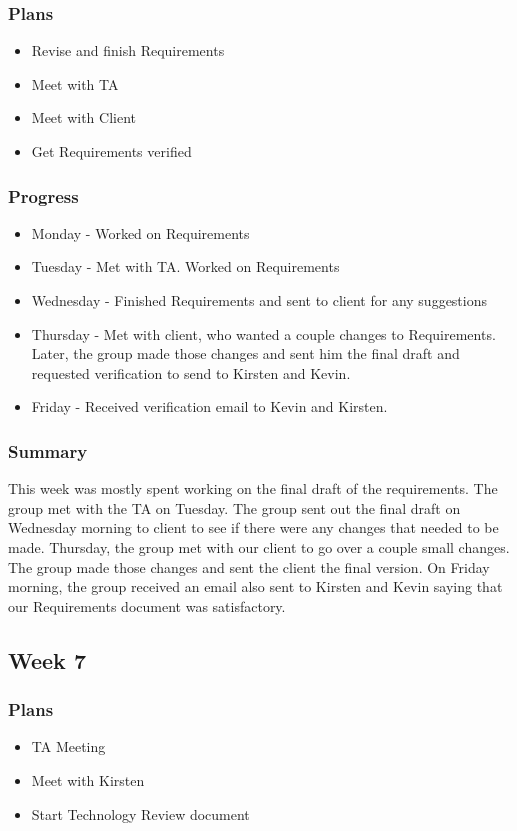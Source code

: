 \documentclass[onecolumn, draftclsnofoot,10pt, compsoc]{IEEEtran}
\begin{document}
\subsubsection{Plans}
\begin{itemize}
\item Revise and finish Requirements
\item Meet with TA
\item Meet with Client
\item Get Requirements verified

\end{itemize}

\subsubsection{Progress}
\begin{itemize}
\item Monday - Worked on Requirements
\item Tuesday - Met with TA. Worked on Requirements
\item Wednesday - Finished Requirements and sent to client for any suggestions
\item Thursday - Met with client, who wanted a couple changes to Requirements. Later, the group made those changes and sent him the final draft and requested verification to send to Kirsten and Kevin.
\item Friday - Received verification email to Kevin and  Kirsten. 

\end{itemize}
\subsubsection{Summary}
This week was mostly spent working on the final draft of the requirements. The group met with the TA on Tuesday. The group sent out the final draft on Wednesday morning to client to see if there were any changes that needed to be made. Thursday, the group met with our client to go over a couple small changes. The group made those changes and sent the client the final version. On Friday morning, the group received an email also sent to Kirsten and Kevin saying that our Requirements document was satisfactory. 
\subsection{Week 7}

\subsubsection{Plans}
\begin{itemize}
\item TA Meeting
\item Meet with Kirsten
\item Start Technology Review document

\end{itemize}
\end{document}
